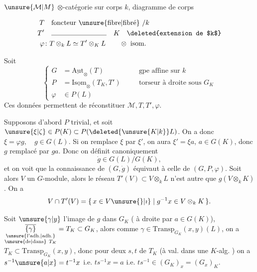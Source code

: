 $\unsure{\mathcal M|M}$ $\otimes$-catégorie sur corps $k$,
diagramme de corps

\[
\begin{aligned}
T&\quad\text{foncteur \unsure{fibre|fibré} }/k\\
T'&\quad\rule{2.8cm}{.35pt}\quad K\quad\text{\deleted{extension de $k$}}\\
\varphi&\colon T\otimes_k L\simeq T'\otimes_K L\qquad\otimes\ \text{isom.}
\end{aligned}
\]

Soit
\[
\left\{\begin{aligned}
G&=\underline{\mathrm{Aut}}_{\otimes}(T)&\quad&\text{gpe affine sur }k\\
P&=\underline{\mathrm{Isom}}_{\otimes}(T_K,T')&&\text{torseur à droite sous }G_K\\
\varphi&\in P(L)
\end{aligned}\right.
\]
Ces données permettent de réconstituer $\mathcal M,T,T',\varphi$.

Supposons d'abord $P$ trivial, et soit $\unsure{\xi|\zeta}\in P(K)\subset P(\deleted{\unsure{K|k}}L)$. On a donc $\xi=\varphi g,\quad g\in G(L)$. Si on remplace $\xi$ par $\xi'$, on aura $\xi'=\xi a$, $a\in G(K)$, donc $g$ remplacé par $ga$. Donc on définit canoniquement
\[
\dot g\in G(L)/G(K),
\]
et on voit que la connaissance de $(G,\dot g)$ équivaut à celle de $(G,P,\varphi)$. Soit alors $V$ un $G$-module, alors le réseau $T'(V)\subset V\otimes_k L$ n'est autre que $g(V\otimes_k K)$. On a
\[
V\cap T'(V)=\{\,x\in V\unsure{\}|\imath}\mid g^{-1}x\in V\otimes_k K\,\}.
\]

  Soit $\unsure{\gamma|y}$ l'image de $g$ dans $G_K$ (  à droite par $a\in G(K)$), $\underset{\substack{\text{\unsure{l'adh.|adh.}}\\\text{\unsure{de|dans}}\ T_K}}{\overline{\{\gamma\}}}=T_K\subset G_K$,  alors  comme  $\gamma\in\mathrm{Transp}_{G_K}(x,y)(L)$, on a $T_K\subset\mathrm{Transp}_{G_K}(x,y)$,  donc pour deux   $s,t$  de $T_K$ (à val. dans une $K$-alg. ) on a $s^{-1}\unsure{a|x}=t^{-1}x$ i.e. $ts^{-1}x=a$ i.e. $ts^{-1}\in(G_K)_x=(G_x)_K$.

